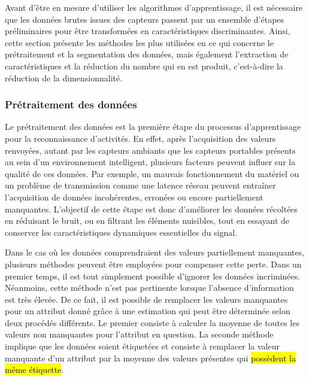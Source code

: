 Avant d'être en mesure d'utiliser les algorithmes d'apprentissage, il est nécessaire que les données brutes issues des capteurs passent par un ensemble d'étapes préliminaires pour être transformées en caractéristiques discriminantes. Ainsi, cette section présente les méthodes les plus utilisées en ce qui concerne le prétraitement et la segmentation des données, mais également l'extraction de caractéristiques et la réduction du nombre qui en est produit, c'est-à-dire la réduction de la dimensionnalité.

\subsubsection{Prétraitement des données}

Le prétraitement des données est la première étape du processus d'apprentissage pour la reconnaissance d'activités. En effet, après l'acquisition des valeurs renvoyées, autant par les capteurs ambiants que les capteurs portables présents au sein d'un environnement intelligent, plusieurs facteurs peuvent influer sur la qualité de ces données. Par exemple, un mauvais fonctionnement du matériel ou un problème de transmission comme une latence réseau peuvent entraîner l'acquisition de données incohérentes, erronées ou encore partiellement manquantes. L'objectif de cette étape est donc d'améliorer les données récoltées en réduisant le bruit, ou en filtrant les éléments nuisibles, tout en essayant de conserver les caractéristiques dynamiques essentielles du signal.

Dans le cas où les données comprendraient des valeurs partiellement manquantes, plusieurs méthodes peuvent être employées pour compenser cette perte. Dans un premier temps, il est tout simplement possible d'ignorer les données incriminées. Néanmoins, cette méthode n'est pas pertinente lorsque l'absence d'information est très élevée. De ce fait, il est possible de remplacer les valeurs manquantes pour un attribut donné grâce à une estimation qui peut être déterminée selon deux procédés différents. Le premier consiste à calculer la moyenne de toutes les valeurs non manquantes pour l'attribut en question. La seconde méthode implique que les données soient étiquetées et consiste à remplacer la valeur manquante d'un attribut par la moyenne des valeurs présentes qui \hl{possèdent la même étiquette}.

